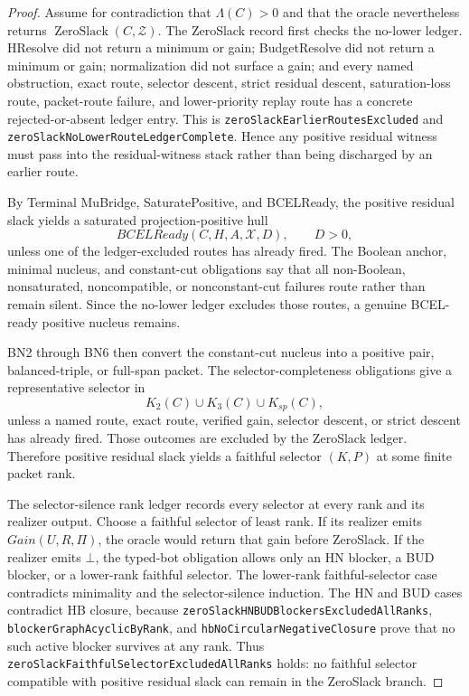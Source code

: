 \documentclass[10.5pt,a4paper]{article}
\newcommand{\ZeroSlack}{\operatorname{ZeroSlack}}
\begin{document}
\begin{proof}
Assume for contradiction that \(\Lambda(C)>0\) and that the oracle nevertheless returns \(\ZeroSlack(C,\mathcal Z)\).  The ZeroSlack record first checks the no-lower ledger.  HResolve did not return a minimum or gain; BudgetResolve did not return a minimum or gain; normalization did not surface a gain; and every named obstruction, exact route, selector descent, strict residual descent, saturation-loss route, packet-route failure, and lower-priority replay route has a concrete rejected-or-absent ledger entry.  This is \texttt{zeroSlackEarlierRoutesExcluded} and \texttt{zeroSlackNoLowerRouteLedgerComplete}.  Hence any positive residual witness must pass into the residual-witness stack rather than being discharged by an earlier route.

By Terminal MuBridge, SaturatePositive, and BCELReady, the positive residual slack yields a saturated projection-positive hull
\[
BCELReady(C,H,A,\mathcal X,D),\qquad D>0,
\]
unless one of the ledger-excluded routes has already fired.  The Boolean anchor, minimal nucleus, and constant-cut obligations say that all non-Boolean, nonsaturated, noncompatible, or nonconstant-cut failures route rather than remain silent.  Since the no-lower ledger excludes those routes, a genuine BCEL-ready positive nucleus remains.

BN2 through BN6 then convert the constant-cut nucleus into a positive pair, balanced-triple, or full-span packet.  The selector-completeness obligations give a representative selector in
\[
K_2(C)\cup K_3(C)\cup K_{sp}(C),
\]
unless a named route, exact route, verified gain, selector descent, or strict descent has already fired.  Those outcomes are excluded by the ZeroSlack ledger.  Therefore positive residual slack yields a faithful selector \((K,P)\) at some finite packet rank.

The selector-silence rank ledger records every selector at every rank and its realizer output.  Choose a faithful selector of least rank.  If its realizer emits \(Gain(U,R,\Pi)\), the oracle would return that gain before ZeroSlack.  If the realizer emits \(\bot\), the typed-bot obligation allows only an HN blocker, a BUD blocker, or a lower-rank faithful selector.  The lower-rank faithful-selector case contradicts minimality and the selector-silence induction.  The HN and BUD cases contradict HB closure, because \texttt{zeroSlackHNBUDBlockersExcludedAllRanks}, \texttt{blockerGraphAcyclicByRank}, and \texttt{hbNoCircularNegativeClosure} prove that no such active blocker survives at any rank.  Thus \texttt{zeroSlackFaithfulSelectorExcludedAllRanks} holds: no faithful selector compatible with positive residual slack can remain in the ZeroSlack branch.


\end{proof}
\end{document}
